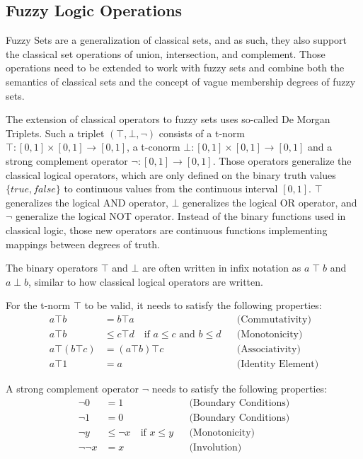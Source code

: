 \subsection{Fuzzy Logic Operations}

Fuzzy Sets are a generalization of classical sets, and as such, they also support the classical set operations of union, intersection, and complement. Those operations need to be extended to work with fuzzy sets and combine both the semantics of classical sets and the concept of vague membership degrees of fuzzy sets.

The extension of classical operators to fuzzy sets uses so-called De Morgan Triplets. Such a triplet $(\top, \bot, \neg)$ consists of a t-norm $\top : [0, 1] \times [0, 1] \rightarrow [0, 1]$, a t-conorm $\bot : [0, 1] \times [0, 1] \rightarrow [0, 1]$ and a strong complement operator $\neg : [0, 1] \rightarrow [0, 1]$. Those operators generalize the classical logical operators, which are only defined on the binary truth values $\{true, false\}$ to continuous values from the continuous interval $[0, 1]$. $\top$ generalizes the logical AND operator, $\bot$ generalizes the logical OR operator, and $\neg$ generalize the logical NOT operator. Instead of the binary functions used in classical logic, those new operators are continuous functions implementing mappings between degrees of truth.

The binary operators $\top$ and $\bot$ are often written in infix notation as $a \; \top \; b$ and $a \; \bot \; b$, similar to how classical logical operators are written.
\smallskip

For the t-norm $\top$ to be valid, it needs to satisfy the following properties:
\begin{align*}
      a \top b          & = b \top a                                                    &  & \text{(Commutativity)}    \\
      a \top b          & \leq c \top d \quad \text{if } a \leq c \text{ and } b \leq d &  & \text{(Monotonicity)}     \\
      a \top (b \top c) & = (a \top b) \top c                                           &  & \text{(Associativity)}    \\
      a \top 1          & = a                                                           &  & \text{(Identity Element)}
\end{align*}

A strong complement operator $\neg$ needs to satisfy the following properties:
\begin{align*}
      \neg 0      & = 1                                   &  & \text{(Boundary Conditions)} \\
      \neg 1      & = 0                                   &  & \text{(Boundary Conditions)} \\
      \neg y      & \leq \neg x \quad \text{if } x \leq y &  & \text{(Monotonicity)}        \\
      \neg \neg x & = x                                   &  & \text{(Involution)}
\end{align*}

